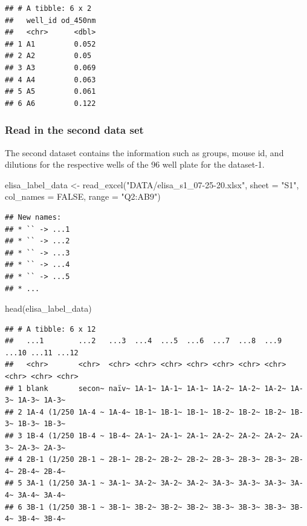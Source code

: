 \documentclass[
]{book}
\newenvironment{Shaded}{\begin{snugshade}}{\end{snugshade}}
\newcommand{\AttributeTok}[1]{\textcolor[rgb]{0.77,0.63,0.00}{#1}}
\newcommand{\ConstantTok}[1]{\textcolor[rgb]{0.00,0.00,0.00}{#1}}
\newcommand{\FunctionTok}[1]{\textcolor[rgb]{0.00,0.00,0.00}{#1}}
\newcommand{\NormalTok}[1]{#1}
\newcommand{\OtherTok}[1]{\textcolor[rgb]{0.56,0.35,0.01}{#1}}
\newcommand{\StringTok}[1]{\textcolor[rgb]{0.31,0.60,0.02}{#1}}
\begin{document}
\begin{verbatim}
## # A tibble: 6 x 2
##   well_id od_450nm
##   <chr>      <dbl>
## 1 A1         0.052
## 2 A2         0.05 
## 3 A3         0.069
## 4 A4         0.063
## 5 A5         0.061
## 6 A6         0.122
\end{verbatim}

\hypertarget{read-in-the-second-data-set}{%
\subsubsection{Read in the second data set}\label{read-in-the-second-data-set}}

The second dataset contains the information such as groups, mouse id, and dilutions for the respective wells of the 96 well plate for the dataset-1.

\begin{Shaded}
\begin{Highlighting}[]
\NormalTok{elisa\_label\_data }\OtherTok{\textless{}{-}} \FunctionTok{read\_excel}\NormalTok{(}\StringTok{"DATA/elisa\_s1\_07{-}25{-}20.xlsx"}\NormalTok{, }
                               \AttributeTok{sheet =} \StringTok{"S1"}\NormalTok{, }\AttributeTok{col\_names =} \ConstantTok{FALSE}\NormalTok{,  }
                               \AttributeTok{range =} \StringTok{"Q2:AB9"}\NormalTok{)}
\end{Highlighting}
\end{Shaded}

\begin{verbatim}
## New names:
## * `` -> ...1
## * `` -> ...2
## * `` -> ...3
## * `` -> ...4
## * `` -> ...5
## * ...
\end{verbatim}

\begin{Shaded}
\begin{Highlighting}[]
\FunctionTok{head}\NormalTok{(elisa\_label\_data)}
\end{Highlighting}
\end{Shaded}

\begin{verbatim}
## # A tibble: 6 x 12
##   ...1        ...2   ...3  ...4  ...5  ...6  ...7  ...8  ...9  ...10 ...11 ...12
##   <chr>       <chr>  <chr> <chr> <chr> <chr> <chr> <chr> <chr> <chr> <chr> <chr>
## 1 blank       secon~ naïv~ 1A-1~ 1A-1~ 1A-1~ 1A-2~ 1A-2~ 1A-2~ 1A-3~ 1A-3~ 1A-3~
## 2 1A-4 (1/250 1A-4 ~ 1A-4~ 1B-1~ 1B-1~ 1B-1~ 1B-2~ 1B-2~ 1B-2~ 1B-3~ 1B-3~ 1B-3~
## 3 1B-4 (1/250 1B-4 ~ 1B-4~ 2A-1~ 2A-1~ 2A-1~ 2A-2~ 2A-2~ 2A-2~ 2A-3~ 2A-3~ 2A-3~
## 4 2B-1 (1/250 2B-1 ~ 2B-1~ 2B-2~ 2B-2~ 2B-2~ 2B-3~ 2B-3~ 2B-3~ 2B-4~ 2B-4~ 2B-4~
## 5 3A-1 (1/250 3A-1 ~ 3A-1~ 3A-2~ 3A-2~ 3A-2~ 3A-3~ 3A-3~ 3A-3~ 3A-4~ 3A-4~ 3A-4~
## 6 3B-1 (1/250 3B-1 ~ 3B-1~ 3B-2~ 3B-2~ 3B-2~ 3B-3~ 3B-3~ 3B-3~ 3B-4~ 3B-4~ 3B-4~
\end{verbatim}
\end{document}
